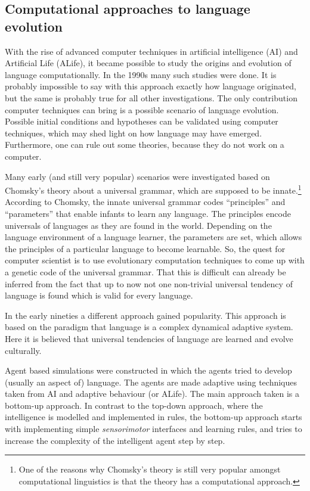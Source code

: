
\subsection{Computational approaches to language evolution}

With the rise of advanced computer techniques in artificial intelligence (AI) and Artificial Life (ALife), it became possible to study the origins and evolution of language computationally. In the 1990s many such studies were done. It is probably impossible to say with this approach exactly how language originated, but the same is probably true for all other investigations. The only contribution computer techniques can bring is a possible scenario of language evolution. Possible initial conditions and hypotheses can be validated using computer techniques, which may shed light on how language may have emerged. Furthermore, one can rule out some theories, because they do not work on a computer.


Many early (and still very popular) scenarios were investigated based on Chomsky's theory about a {\sc universal grammar}, which are supposed to be innate.\footnote{One of the reasons why Chomsky's theory is still very popular amongst computational linguistics is that the theory has a computational approach.} According to Chomsky, the innate universal grammar codes ``principles'' and ``parameters'' that enable infants to learn any language. The principles encode universals of languages as they are found in the world. Depending on the language environment of a language learner, the parameters are set, which allows the principles of a particular language to become learnable. So, the quest for computer scientist is to use evolutionary computation techniques to come up with a genetic code of the universal grammar. That this is difficult can already be inferred from the fact that up to now not one non-trivial universal tendency of language is found which is valid for every language.

In the early nineties a different approach gained popularity. This approach is based on the paradigm that language is a complex dynamical adaptive system. Here it is believed that universal tendencies of language are learned and evolve culturally.

Agent based simulations were constructed in which the agents tried to develop (usually an aspect of) language. The agents are made adaptive using techniques taken from AI and adaptive behaviour (or ALife). The main approach taken is a bottom-up approach. In contrast to the top-down approach, where the intelligence is modelled and implemented in rules, the bottom-up approach starts with implementing simple {\em sensorimotor} interfaces and learning rules, and tries to increase the complexity of the intelligent agent step by step.

